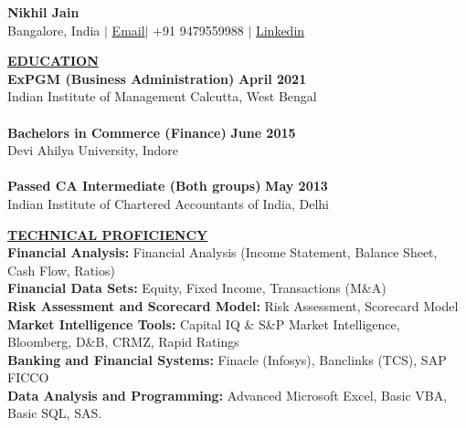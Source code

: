 \documentclass{article}
\begin{document}
\begin{center}
\thispagestyle{empty}
\large \textbf{Nikhil Jain \\}
\normalsize Bangalore, India $\mid$ {\href{mailto:nikhil1394@gmail.com}{Email}}$\mid$ +91 9479559988 $\mid$ \href{}{Linkedin}   \\
\hrulefill
\end{center}


\noindent \textbf{\underline{EDUCATION}} \\
\noindent \textbf{ExPGM (Business Administration)} \hfill \textbf{April 2021} \\
Indian Institute of Management Calcutta, West Bengal \\\\
\noindent \textbf{Bachelors in Commerce (Finance)} \hfill \textbf{June 2015}\\
Devi Ahilya University, Indore \\\\
\noindent \textbf{Passed CA Intermediate (Both groups)}  \hfill \textbf{May 2013}\\
Indian Institute of Chartered Accountants of India, Delhi 

\vspace{2mm}


\noindent \textbf{\underline{TECHNICAL PROFICIENCY}} \\
\textbf{Financial Analysis:} Financial Analysis (Income Statement, Balance Sheet, Cash Flow, Ratios)\\
\textbf{Financial Data Sets:} Equity, Fixed Income, Transactions (M\&A)\\
\textbf{Risk Assessment and Scorecard Model:} Risk Assessment, Scorecard Model\\
\textbf{Market Intelligence Tools:} Capital IQ \& S\&P Market Intelligence, Bloomberg, D\&B, CRMZ, Rapid Ratings\\
\textbf{Banking and Financial Systems:} Finacle (Infosys), Banclinks (TCS), SAP FICCO\\
\textbf{Data Analysis and Programming:} Advanced Microsoft Excel, Basic VBA, Basic SQL, SAS.
\vspace{2mm}
\end{document}
